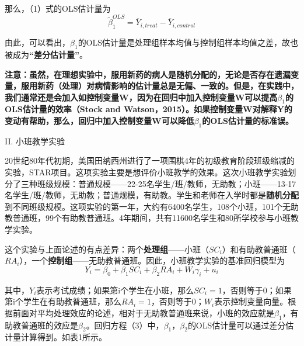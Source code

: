 \documentclass[cn,10pt,math=newtx,citestyle=gb7714-2015,bibstyle=gb7714-2015]{elegantbook}
\begin{document}
	那么，（1）式的OLS估计量为
	\begin{equation}
		\tilde{\beta}_1^{OLS}=\overline{Y}_{i,treat}-\overline{Y}_{i,control}
	\end{equation}
	
	由此，可以看出，$\beta_1$的OLS估计量是处理组样本均值与控制组样本均值之差，故也被成为\textbf{“差分估计量”}。
	
	\textbf{注意：虽然，在理想实验中，服用新药的病人是随机分配的，无论是否存在遗漏变量，服用新药（处理）对病情影响的估计量总是无偏、一致的。但是，在实践中，我们通常还是会加入如控制变量W，因为在回归中加入控制变量W可以提高$\beta_1$的OLS估计量的效率（Stock and Watson，2015）。如果控制变量W对解释Y的变动有帮助，那么，回归中加入控制变量W可以降低$\beta_1$的OLS估计量的标准误。}
	
	II. 小班教学实验
	
	20世纪80年代初期，美国田纳西州进行了一项围棋4年的初级教育阶段班级缩减的实验，STAR项目。这项实验主要是想评价小班教学的效果。这次小班教学实验划分了三种班级规模：普通规模——22-25名学生/班/教师，无助教；小班——13-17名学生/班/教师，无助教；普通规模，有助教。学生和老师在入学时都是\textbf{随机分配}到不同班级规模。这项实验的第一年，大约有6400名学生，108个小班，101个无助教普通班，99个有助教普通班。4年期间，共有11600名学生和80所学校参与小班教学实验。
	
	这个实验与上面论述的有点差异：两个\textbf{处理组}——小班（$SC_i$）和有助教普通班（$RA_i$），一个\textbf{控制组}——无助教普通班。因此，小班教学实验的基准回归模型为
	\begin{equation}
		Y_i=\beta_0+\beta_1SC_i+\beta_2RA_i+W_i\gamma_i+u_i
	\end{equation}
	
	其中，$Y_i$表示考试成绩；如果第i个学生在小班，那么$SC_i=1$，否则等于0；如果第i个学生在有助教普通班，那么$RA_i=1$，否则等于0；$W_i$表示控制变量向量。根据前面对平均处理效应的论述，相对于无助教普通班来说，小班的效应就是$\beta_1$，有助教普通班的效应是$\beta_2$。回归方程（3）中，$\beta_1$，$\beta_2$的OLS估计量可以通过差分估计量计算得到。如表1所示。
	
\end{document}
